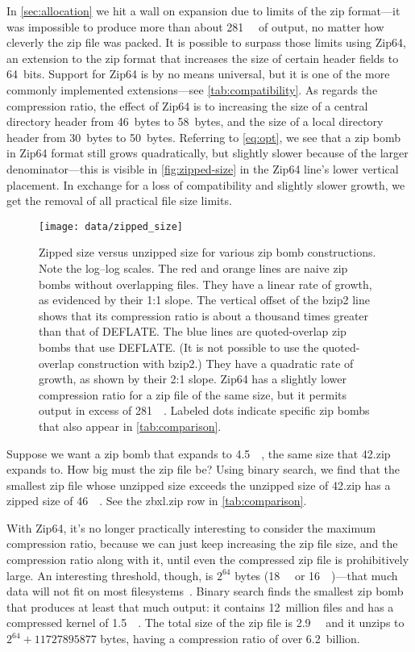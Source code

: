\documentclass[letterpaper,twocolumn,10pt]{article}
\newcommand{\MB}{\mega\byte}
\newcommand{\GB}{\giga\byte}
\newcommand{\TB}{\tera\byte}
\newcommand{\PB}{\peta\byte}
\newcommand{\EB}{\exa\byte}
\newcommand{\EiB}{\exbi\byte}
\begin{document}
In \autoref{sec:allocation} we hit a wall on expansion
due to limits of the zip format---it was impossible
to produce more than about \SI{281}{\TB} of output,
no matter how cleverly the zip file was packed.
It is possible to surpass those limits
using Zip64, an extension to the zip format that increases
the size of certain header fields to 64~bits.
Support for Zip64 is by no means universal,
but it is one of the more commonly implemented extensions---see \autoref{tab:compatibility}.
As regards the compression ratio,
the effect of Zip64 is to
increasing the size of a central directory header from
\SI{46}{bytes} to \SI{58}{bytes},
and the size of a local directory header from
\SI{30}{bytes} to \SI{50}{bytes}.
Referring to \autoref{eq:opt},
we see that a zip bomb in Zip64 format
still grows quadratically,
but slightly slower because of the larger denominator---this
is visible in \autoref{fig:zipped-size} in the Zip64 line's
lower vertical placement.
In exchange for a loss of compatibility
and slightly slower growth,
we get the removal of all practical file size limits.

\begin{figure}
\texttt{[image: data/zipped\_size]}
\caption{
Zipped size versus unzipped size for various zip bomb constructions.
Note the log--log scales.
The red and orange lines are naive zip bombs without overlapping files.
They have a linear rate of growth,
as evidenced by their 1:1 slope.
The vertical offset of the bzip2 line shows that its compression ratio
is about a thousand times greater than that of DEFLATE.
The blue lines are quoted-overlap zip bombs that use DEFLATE.
(It is not possible to use the quoted-overlap construction with bzip2.)
They have a quadratic rate of growth,
as shown by their 2:1 slope.
Zip64 has a slightly lower compression ratio
for a zip file of the same size,
but it permits output in excess of \SI{281}{\TB}.
Labeled dots indicate specific zip bombs that
also appear in \autoref{tab:comparison}.
}
\label{fig:zipped-size}
\end{figure}

Suppose we want a zip bomb that expands to \SI{4.5}{\PB},
the same size that 42.zip expands to.
How big must the zip file be?
Using binary search, we find that the smallest
zip file whose unzipped size exceeds the unzipped size of 42.zip
has a zipped size of \SI{46}{\MB}.
See the \mbox{zbxl.zip} row in \autoref{tab:comparison}.

With Zip64, it's no longer practically interesting to
consider the maximum compression ratio,
because we can just keep increasing the zip file size,
and the compression ratio along with it,
until even the compressed zip file is prohibitively large.
An interesting threshold, though,
is $2^{64}$ bytes
(\SI{18}{\EB} or \SI{16}{\EiB})---that
much data will not fit on most filesystems~\cite[\S Limits]{wiki-fs}.
Binary search finds the smallest zip bomb that produces at least that much output:
it contains 12~million files and has a compressed kernel of \SI{1.5}{\GB}.
The total size of the zip file is \SI{2.9}{\GB} and it unzips
to $2^{64}+\num{11727895877}$ bytes,
having a compression ratio of over 6.2~billion.
\end{document}
